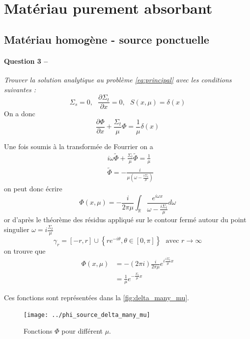 \documentclass[11pt,a4paper]{article}
\newcommand{\dx}[1]{\dfrac{\partial #1}{\partial x}}
\newcommand{\question}[2]{\paragraph{Question #1 --}\hspace{-7pt}\textit{#2} \\}
\newcommand{\tphi}{\widetilde{\Phi}}
\begin{document}
\section{Matériau purement absorbant}

\subsection{Matériau homogène - source ponctuelle}

\question{3}{Trouver la solution analytique au problème \autoref{eq:principal} avec les conditions suivantes :}

\begin{equation}
  \Sigma_s=0, ~~~ \dx{\Sigma_t} = 0, ~~~ S(x, \mu) = \delta(x)
\end{equation}
On a donc 
\begin{equation}
  \dx{\Phi} + \frac{\Sigma_t}{\mu} \Phi = \frac{1}{\mu} \delta(x)
\end{equation}

Une fois soumis à la transformée de Fourrier on a 
\begin{align}
  &i \omega \tphi + \frac{\Sigma_t}{\mu} \tphi = \frac{1}{\mu} \\
  &\tphi = -\frac{i}{\mu\left(\omega - \frac{i \Sigma_t}{\mu}\right)}
\end{align}
on peut donc écrire 
\begin{equation}
  \Phi (x, \mu) = -\frac{i}{2\pi\mu} \int_{\mathbb{R}} \frac{e^{i\omega x}}{\omega - \frac{i \Sigma_t}{\mu}} d\omega 
\end{equation}
or d'après le théorème des résidus appliqué sur le contour fermé autour du point singulier $\omega = i\frac{\Sigma_t}{\mu}$
\begin{equation}
  \gamma_r = [-r,r]\cup\left\{r e^{-i \theta}, \theta \in [0, \pi] \right\} ~~~ \mbox{avec } r \to \infty
\end{equation}
on trouve que
\begin{align}
  \Phi (x, \mu) &= - (2 \pi i) \frac{i}{2\pi\mu} e^{i \frac{i \Sigma_t}{\mu} x} \\
                &= \frac{1}{\mu} e^{-\frac{\Sigma_t}{\mu} x} 
\end{align}

Ces fonctions sont représentées dans la \autoref{fig:delta_many_mu}.

\begin{figure}
  \centering
  \texttt{[image: ../phi\_source\_delta\_many\_mu]}
  \caption{Fonctions $\Phi$ pour différent $\mu$.}
  \label{fig:delta_many_mu}
\end{figure}
\end{document}
